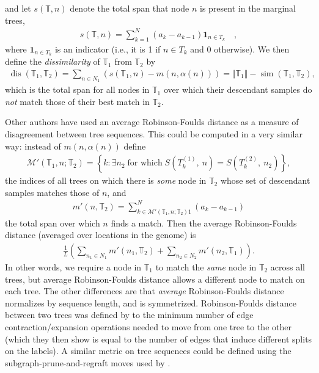 \documentclass[10pt,twoside,lineno]{gsajnl}
\newcommand{\T}{\mathbb{T}}
\newcommand{\ind}{\mathbf{1}}
\newcommand{\dis}{\operatorname{dis}}
\newcommand{\similarity}{\operatorname{sim}}
\begin{document}
and let $s(\T,n)$ denote
the total span that node $n$ is present in the marginal trees,
\begin{align*}
    s(\T, n) = \sum_{k=1}^N (a_k - a_{k-1}) \ind_{n \in T_k} \quad ,
\end{align*}
where $\ind_{n \in T_k}$ is an indicator (i.e., it is 1 if $n \in T_k$ and 0 otherwise).
We then define the \emph{dissimilarity} of $\T_1$ from $\T_2$ by
\begin{align*}
    \dis(\T_1, \T_2)
    =
    \sum_{n \in N_1} (s(\T_1, n) - m(n, \alpha(n))) 
    = 
    \Vert \T_1\Vert -\similarity(\T_1,\T_2),
\end{align*}
which is the total span for all nodes in $\T_1$
over which their descendant samples do \emph{not} match those of their best match in $\T_2$.

Other authors \citep[e.g.,][]{kelleher2019inferring} have used
an average Robinson-Foulds distance \citep{robinson1981comparison}
as a measure of disagreement between tree sequences.
This could be computed in a very similar way:
instead of $m(n, \alpha(n))$ define
\begin{align*}
    \mathcal{M}'(\T_1, n; \T_2) = \left\{ k : \exists n_2  \;\text{for which}\; S\left(T^{(1)}_k,\ n\right) = S\left(T^{(2)}_k,\ n_2\right) \right\},
\end{align*}
the indices of all trees on which there is \emph{some} node in $\T_2$
whose set of descendant samples matches those of $n$, and
\begin{align*}
    m'(n, \T_2) = \sum_{k \in \mathcal{M}'(\T_1, n; \T_2)1}^N (a_k - a_{k-1})
\end{align*}
the total span over which $n$ finds a match.
Then the average Robinson-Foulds distance (averaged over locations in the genome)
is
\begin{align*}
    \frac{1}{L} \left( \sum_{n_1 \in N_1} m'(n_1, \T_2)  + \sum_{n_2 \in N_2} m'(n_2, \T_1) \right).
\end{align*}
In other words, we require a node in $\T_1$ to match the \emph{same} node in $\T_2$
across all trees, but average Robinson-Foulds distance allows a different node to match
on each tree.
The other differences are that \emph{average} Robinson-Foulds distance
normalizes by sequence length, and is symmetrized.
Robinson-Foulds distance between two trees
was defined by \citet{robinson1981comparison}
to the minimum number of edge contraction/expansion operations needed to move
from one tree to the other
(which they then show is equal to the number of edges that induce different splits on the labels).
A similar metric on tree sequences could be defined
using the subgraph-prune-and-regraft moves used by \citet{deng2024robust}.
\end{document}
